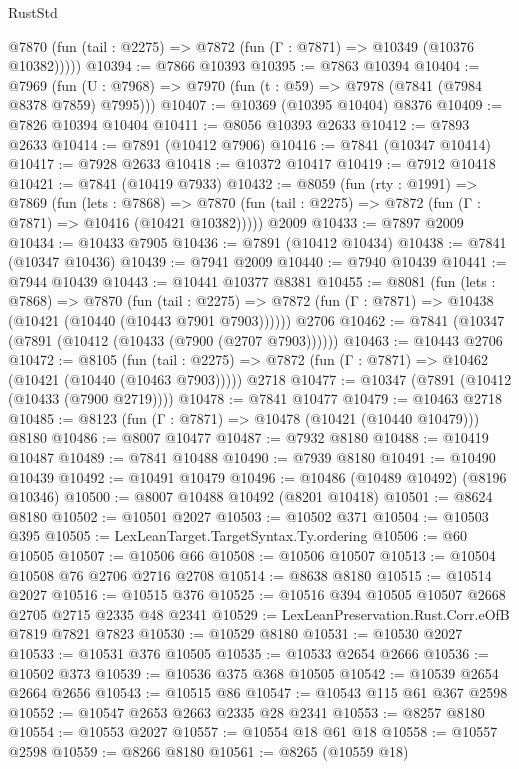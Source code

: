 \begin{lexlean}{RustStd}
\begin{coremodule}
{\begin{coremodule}
{{{{{{{{{{{{{{{{{{{{{{{{{{{{{{{{{{{{{{{{{{{{{{{{{{{{{{      @7870 (fun (tail : @2275) => @7872 (fun (Γ : @7871) => @10349 (@10376 @10382)))))
@10394 := @7866 @10393
@10395 := @7863 @10394
@10404 := @7969
    (fun (U : @7968) => @7970 (fun (t : @59) => @7978 (@7841 (@7984 @8378 @7859) @7995)))
@10407 := @10369 (@10395 @10404) @8376
@10409 := @7826 @10394 @10404
@10411 := @8056 @10393 @2633
@10412 := @7893 @2633
@10414 := @7891 (@10412 @7906)
@10416 := @7841 (@10347 @10414)
@10417 := @7928 @2633
@10418 := @10372 @10417
@10419 := @7912 @10418
@10421 := @7841 (@10419 @7933)
@10432 := @8059
    (fun (rty : @1991) =>
    @7869
      (fun (lets : @7868) =>
      @7870 (fun (tail : @2275) => @7872 (fun (Γ : @7871) => @10416 (@10421 @10382)))))
    @2009
@10433 := @7897 @2009
@10434 := @10433 @7905
@10436 := @7891 (@10412 @10434)
@10438 := @7841 (@10347 @10436)
@10439 := @7941 @2009
@10440 := @7940 @10439
@10441 := @7944 @10439
@10443 := @10441 @10377 @8381
@10455 := @8081
    (fun (lets : @7868) =>
    @7870
      (fun (tail : @2275) =>
      @7872 (fun (Γ : @7871) => @10438 (@10421 (@10440 (@10443 @7901 @7903))))))
    @2706
@10462 := @7841 (@10347 (@7891 (@10412 (@10433 (@7900 (@2707 @7903))))))
@10463 := @10443 @2706
@10472 := @8105
    (fun (tail : @2275) => @7872 (fun (Γ : @7871) => @10462 (@10421 (@10440 (@10463 @7903)))))
    @2718
@10477 := @10347 (@7891 (@10412 (@10433 (@7900 @2719))))
@10478 := @7841 @10477
@10479 := @10463 @2718
@10485 := @8123 (fun (Γ : @7871) => @10478 (@10421 (@10440 @10479))) @8180
@10486 := @8007 @10477
@10487 := @7932 @8180
@10488 := @10419 @10487
@10489 := @7841 @10488
@10490 := @7939 @8180
@10491 := @10490 @10439
@10492 := @10491 @10479
@10496 := @10486 (@10489 @10492) (@8196 @10346)
@10500 := @8007 @10488 @10492 (@8201 @10418)
@10501 := @8624 @8180
@10502 := @10501 @2027
@10503 := @10502 @371
@10504 := @10503 @395
@10505 := LexLeanTarget.TargetSyntax.Ty.ordering
@10506 := @60 @10505
@10507 := @10506 @66
@10508 := @10506 @10507
@10513 := @10504 @10508 @76 @2706 @2716 @2708
@10514 := @8638 @8180
@10515 := @10514 @2027
@10516 := @10515 @376
@10525 := @10516 @394 @10505 @10507 @2668 @2705 @2715 @2335 @48 @2341
@10529 := LexLeanPreservation.Rust.Corr.eOfB @7819 @7821 @7823
@10530 := @10529 @8180
@10531 := @10530 @2027
@10533 := @10531 @376 @10505
@10535 := @10533 @2654 @2666
@10536 := @10502 @373
@10539 := @10536 @375 @368 @10505
@10542 := @10539 @2654 @2664 @2656
@10543 := @10515 @86
@10547 := @10543 @115 @61 @367 @2598
@10552 := @10547 @2653 @2663 @2335 @28 @2341
@10553 := @8257 @8180
@10554 := @10553 @2027
@10557 := @10554 @18 @61 @18
@10558 := @10557 @2598
@10559 := @8266 @8180
@10561 := @8265 (@10559 @18)
}}}}}}}}}}}}}}}}}}}}}}}}}}}}}}}}}}}}}}}}}}}}}}}}}}}}}}
\end{coremodule}}
\end{coremodule}
\end{lexlean}
